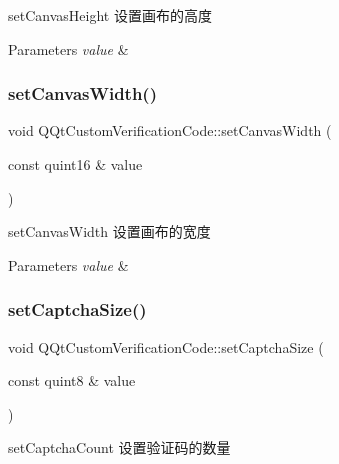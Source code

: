 set\+Canvas\+Height 设置画布的高度 


\begin{DoxyParams}{Parameters}
{\em value} & \\
\hline
\end{DoxyParams}
\mbox{\label{class_q_qt_custom_verification_code_ab1e673bff70db1224ade11a3c6e0b54b}} 
\subsubsection{\texorpdfstring{set\+Canvas\+Width()}{setCanvasWidth()}}
{\footnotesize\ttfamily void Q\+Qt\+Custom\+Verification\+Code\+::set\+Canvas\+Width (\begin{DoxyParamCaption}\item[{const quint16 \&}]{value }\end{DoxyParamCaption})}



set\+Canvas\+Width 设置画布的宽度 


\begin{DoxyParams}{Parameters}
{\em value} & \\
\hline
\end{DoxyParams}
\mbox{\label{class_q_qt_custom_verification_code_a93f46516afd27edb00b9330be16f28c4}} 
\subsubsection{\texorpdfstring{set\+Captcha\+Size()}{setCaptchaSize()}}
{\footnotesize\ttfamily void Q\+Qt\+Custom\+Verification\+Code\+::set\+Captcha\+Size (\begin{DoxyParamCaption}\item[{const quint8 \&}]{value }\end{DoxyParamCaption})}



set\+Captcha\+Count 设置验证码的数量 


